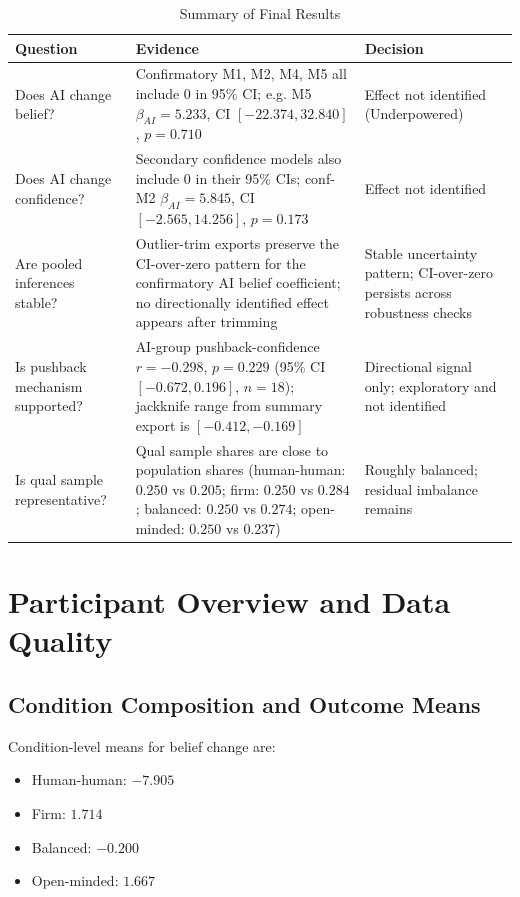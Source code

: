 \begin{table}[h]
\centering
\caption{Summary of Final Results}
\label{tab:key_findings}
\renewcommand{\arraystretch}{1.4}
\begin{tabular}{L{3.8cm}L{7.3cm}L{2.7cm}}
\toprule
Question & Evidence & Decision \\
\midrule
Does AI change belief? & Confirmatory M1, M2, M4, M5 all include 0 in 95\% CI; e.g. M5 $\beta_{AI}=5.233$, CI $[-22.374, 32.840]$, $p=0.710$ & Effect not identified (Underpowered) \\
Does AI change confidence? & Secondary confidence models also include 0 in their 95\% CIs; conf-M2 $\beta_{AI}=5.845$, CI $[-2.565, 14.256]$, $p=0.173$ & Effect not identified \\
Are pooled inferences stable? & Outlier-trim exports preserve the CI-over-zero pattern for the confirmatory AI belief coefficient; no directionally identified effect appears after trimming & Stable uncertainty pattern; CI-over-zero persists across robustness checks \\
Is pushback mechanism supported? & AI-group pushback-confidence $r=-0.298$, $p=0.229$ (95\% CI $[-0.672, 0.196]$, $n=18$); jackknife range from summary export is $[-0.412,-0.169]$ & Directional signal only; exploratory and not identified \\
Is qual sample representative? & Qual sample shares are close to population shares (human-human: $0.250$ vs $0.205$; firm: $0.250$ vs $0.284$; balanced: $0.250$ vs $0.274$; open-minded: $0.250$ vs $0.237$) & Roughly balanced; residual imbalance remains \\
\bottomrule
\end{tabular}
\end{table}

\pagebreak
\section{Participant Overview and Data Quality}

\subsection{Condition Composition and Outcome Means}
\label{sec:part10}

Condition-level means for belief change are:
\begin{itemize}
    \item Human-human: $-7.905$
    \item Firm: $1.714$
    \item Balanced: $-0.200$
    \item Open-minded: $1.667$
\end{itemize}

